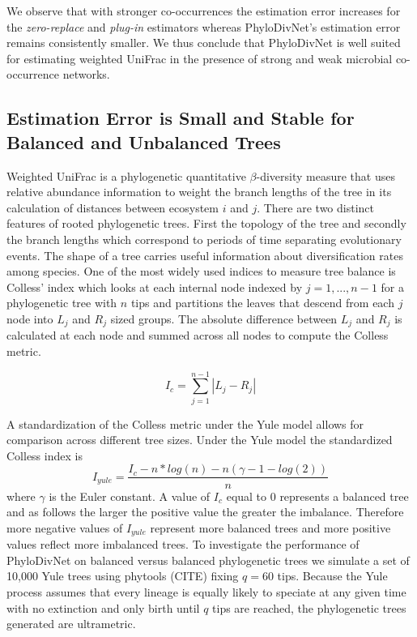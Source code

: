 \documentclass{article}
\newcommand*{\myfont}{\fontfamily{lmtt}\selectfont}
\begin{document}
We observe that with stronger co-occurrences the estimation error increases for the \textit{zero-replace} and \textit{plug-in} estimators whereas {\myfont PhyloDivNet}'s estimation error remains consistently smaller. We thus conclude that {\myfont PhyloDivNet} is well suited for estimating weighted UniFrac in the presence of strong and weak microbial co-occurrence networks.

\subsection{Estimation Error is Small and Stable for Balanced and Unbalanced Trees}
Weighted UniFrac is a phylogenetic quantitative $\beta$-diversity measure that uses relative abundance information to weight the branch lengths of the tree in its calculation of distances between ecosystem $i$ and $j$. There are two distinct features of rooted phylogenetic trees. First the topology of the tree and secondly the branch lengths which correspond to periods of time separating evolutionary events. The shape of a tree carries useful information about diversification rates among species. One of the most widely used indices to measure tree balance is Colless' index which looks at each internal node indexed by $j = 1,...,n-1$ for a phylogenetic tree with $n$ tips and partitions the leaves that descend from each $j$ node into $L_j$ and $R_j$ sized groups. The absolute difference between $L_j$ and $R_j$ is calculated at each node and summed across all nodes to compute the Colless metric.

\begin{equation}
  I_c = \sum_{j=1}^{n-1}|L_j-R_j|
\end{equation}

A standardization of the Colless metric under the Yule model allows for comparison across different tree sizes. Under the Yule model the standardized Colless index is
\begin{equation}
  I_{yule} = \frac{I_c - n * log(n) - n(\gamma - 1 - log(2))}{n}
\end{equation}
where $\gamma$ is the Euler constant. A value of $I_c$ equal to 0 represents a balanced tree and as follows the larger the positive value the greater the imbalance. Therefore more negative values of $I_{yule}$ represent more balanced trees and more positive values reflect more imbalanced trees. To investigate the performance of {\myfont PhyloDivNet} on balanced versus balanced phylogenetic trees we simulate a set of 10,000 Yule trees using {\myfont phytools} (CITE) fixing $q = 60$ tips. Because the Yule process assumes that every lineage is equally likely to speciate at any given time with no extinction and only birth until $q$ tips are reached, the phylogenetic trees generated are ultrametric.
\end{document}
